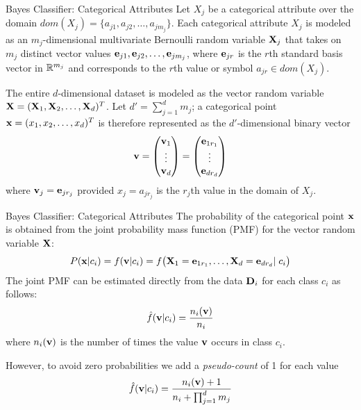 \begin{frame}{Bayes Classifier: Categorical Attributes}
Let $X_{j}$ be a
categorical attribute over the domain $dom(X_{j}) = \{a_{j1},
a_{j2}, \ldots, a_{jm_{j}}\}$. Each categorical attribute
$X_{j}$ is modeled as an $m_{j}$-dimensional multivariate Bernoulli
random variable $\mathbf{X}_{j}$ that takes on $m_{j}$ distinct vector values
$\mathbf{e}_{j1}, \mathbf{e}_{j2}, \dots, \mathbf{e}_{jm_{j}}$, where $\mathbf{e}_{jr}$ is the
$r$th standard basis vector in ${\mathord{\mathbb R}}^{m_{j}}$ and corresponds to
the $r$th value or symbol $a_{jr} \in dom(X_{j})$. 

\bigskip
The entire
$d$-dimensional dataset is modeled as the vector random variable $\mathbf{X} = (\mathbf{X}_1, \mathbf{X}_2, \ldots,
\mathbf{X}_d)^T$. Let $d' = \sum_{j=1}^d m_{j}$; a categorical point $\mathbf{x} = (x_1,x_2,\dots,x_d)^T$ is
therefore represented as the $d'$-dimensional binary vector
\begin{align*}
  \bv = \matr{\bv_1\\\vdots\\\bv_d}
  = \matr{\be_{1r_1}\\\vdots\\\be_{dr_d}}
\end{align*}
where $\mathbf{v}_{j} = \mathbf{e}_{jr_{j}}$ provided $x_{j} = a_{jr_{j}}$ is the
$r_{j}$th value in the domain of $X_{j}$. 
\end{frame}



\begin{frame}{Bayes Classifier: Categorical Attributes}
The probability of the
categorical point $\mathbf{x}$ is obtained from the joint probability
mass function (PMF) for the vector random variable $\mathbf{X}$:
\begin{align*}
  P(\mathbf{x} | c_i) = f(\mathbf{v}|c_i)  =
    f\bigl(\mathbf{X}_1=\mathbf{e}_{1r_1}, \dots, \mathbf{X}_d=\mathbf{e}_{dr_d} | \;c_i\bigr)
\end{align*}
The joint PMF can be estimated directly from the data
$\mathbf{D}_i$ for each class $c_i$ as follows:
\begin{align*}
    \kern3pt\hat{\kern-3pt f}(\mathbf{v}|c_i) = {n_i(\mathbf{v}) \over n_i}
\end{align*}
where $n_i(\mathbf{v})$ is the number of times the value $\mathbf{v}$ occurs in
class $c_i$.

However, to avoid zero probabilities we add a 
{\em pseudo-count} of 1 for each value 
\begin{align*}
    \kern3pt\hat{\kern-3pt f}(\mathbf{v}|c_i) = {n_i(\mathbf{v})+1 \over n_i + \prod_{j=1}^d m_{j}}
\end{align*}
\end{frame}


